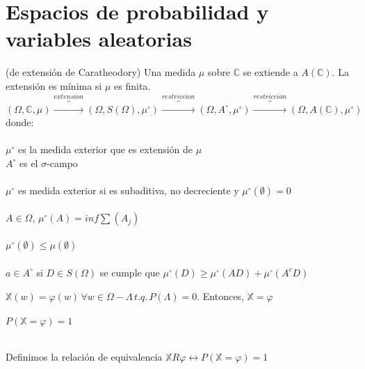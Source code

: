 \documentclass[12pt,a4paper]{book}
\begin{document}
\section{Espacios de probabilidad y variables aleatorias}
\begin{theorem} (de extensión de Caratheodory) 
Una medida $\mu$ sobre $\mathbb{C}$ se extiende a $A(\mathbb{C})$. La extensión es mínima si $\mu$ es finita.
$$(\Omega,\mathbb{C},\mu)\overbrace{\longrightarrow}^{extension}(\Omega,S(\Omega),\mu^\circ)\overbrace{\longrightarrow}^{restriccion}(\Omega,A^\circ,\mu^\circ)\overbrace{\longrightarrow}^{restriccion}(\Omega,A(\mathbb{C}),\mu^\circ)$$
donde:\\\\
$\mu^\circ$ es la medida exterior que es extensión de $\mu$\\
$A^\circ$ es el $\sigma$-campo\\\\
$\mu^\circ$ es medida exterior si es subaditiva, no decreciente y $\mu^\circ(\emptyset)=0$
\\\\
$A\in \Omega$, $\mu^\circ(A)=inf\displaystyle\sum(A_j)$\\\\
$\mu^\circ(\emptyset)\leq\mu(\emptyset)$\\\\
$a\in A^\circ$ si $D\in S(\Omega)$ se cumple que $\mu^\circ(D)\geq\mu^\circ(AD)+\mu^\circ(A^c D)$
\end{theorem}

\begin{lemma} 
$\mathbb{X}(w)=\varphi(w)\,\forall w \in \Omega - \Lambda\, t.q.\, P(\Lambda)=0$. Entonces, $\mathbb{X}=\varphi$ \\\\
$P(\mathbb{X}=\varphi)=1$\\\\
\end{lemma}
Definimos la relación de equivalencia $\mathbb{X}R\varphi\leftrightarrow P(\mathbb{X}=\varphi)=1$
\end{document}
